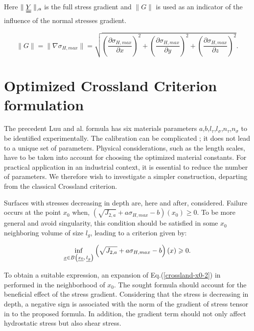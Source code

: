 Here $\parallel \uuline{\uline{Y}}\parallel_{,a}$ is the full stress gradient and $\parallel G\parallel$ is used as an indicator of the influence of the normal stresses gradient.

\begin{equation}
	\parallel{G}\parallel=\parallel{\nabla \sigma_{H,max}}\parallel=\sqrt{\left(\dfrac{\partial \sigma_{H,max}}{\partial x}\right)^2+\left(\dfrac{\partial \sigma_{H,max}}{\partial y}\right)^2+\left(\dfrac{\partial \sigma_{H,max}}{\partial z}\right)^2} .
\end{equation}



\section{Optimized Crossland Criterion formulation}
The precedent Luu and al. formula has six materials parameters $a$,$b$,$l_\tau$,$l_\sigma$,$n_\tau$,$n_\sigma$ to be identified experimentally. The calibration can be complicated ; it does not lead to a unique set of parameters. Physical considerations, such as the length scales, have to be taken into account for choosing the optimized material constants. For practical application in an industrial context, it is essential to reduce the number of parameters. We therefore wish to investigate a simpler construction, departing from the classical Crossland criterion.

Surfaces with stresses decreasing in depth are, here and after, considered. Failure occurs at the point $x_0$ when,  $(\sqrt{J_{2,a}}+a\sigma_{H,max}-b)(x_0)\geqslant 0 $. To be more general and avoid singularity, this condition should be satisfied in some $x_0$ neighboring volume of size $l_g$, leading to a criterion given by:

\begin{equation}
	\inf\limits_{\uline{x}\in B\left( \uline{x_0},\,\uline{l_g}\right) }\left( \sqrt{J_{2,a}}+a\sigma_{H,max}-b\right) (x)\geqslant 0 .
	\label{crossland-x0-2}
\end{equation}

To obtain a suitable expression, an expansion of Eq.(\ref{crossland-x0-2}) in performed in the neighborhood of ${x_0}$. The sought formula should account for the beneficial effect of the stress gradient. Considering that the stress is decreasing in depth, a negative sign is associated with the norm of the gradient of stress tensor in to the proposed formula. In addition, the gradient term should not only affect hydrostatic stress but also shear stress.

